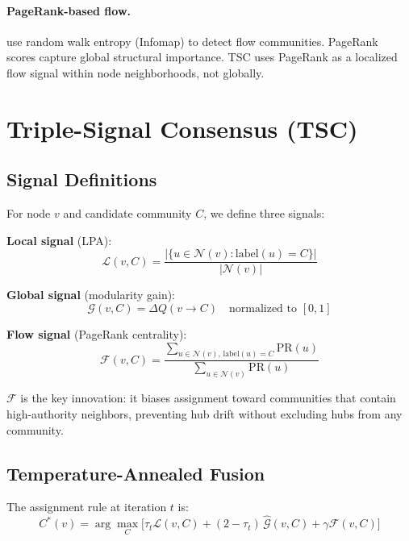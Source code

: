 \documentclass[10pt,twocolumn]{article}
\begin{document}
\paragraph{PageRank-based flow.}
\citet{rosvall2008infomap} use random walk entropy (Infomap) to detect flow communities.
PageRank~\cite{page1999pagerank} scores capture global structural importance. TSC uses
PageRank as a localized flow signal within node neighborhoods, not globally.

\section{Triple-Signal Consensus (TSC)}
\label{sec:tsc}

\subsection{Signal Definitions}

For node $v$ and candidate community $C$, we define three signals:

\textbf{Local signal} (LPA):
\begin{equation}
\mathcal{L}(v,C) = \frac{|\{u \in \mathcal{N}(v): \mathrm{label}(u) = C\}|}{|\mathcal{N}(v)|}
\label{eq:local}
\end{equation}

\textbf{Global signal} (modularity gain):
\begin{equation}
\mathcal{G}(v,C) = \Delta Q(v \to C) \quad \text{normalized to } [0,1]
\label{eq:global}
\end{equation}

\textbf{Flow signal} (PageRank centrality):
\begin{equation}
\mathcal{F}(v,C) = \frac{\sum_{u \in \mathcal{N}(v),\,\mathrm{label}(u)=C} \mathrm{PR}(u)}
                        {\sum_{u \in \mathcal{N}(v)} \mathrm{PR}(u)}
\label{eq:flow}
\end{equation}

$\mathcal{F}$ is the key innovation: it biases assignment toward communities that contain
high-authority neighbors, preventing hub drift without excluding hubs from any community.

\subsection{Temperature-Annealed Fusion}

The assignment rule at iteration $t$ is:
\begin{equation}
C^*(v) = \arg\max_{C} \bigl[ \tau_t \mathcal{L}(v,C) + (2-\tau_t)\,\widehat{\mathcal{G}}(v,C)
                              + \gamma \mathcal{F}(v,C) \bigr]
\label{eq:tsc}
\end{equation}
\end{document}
